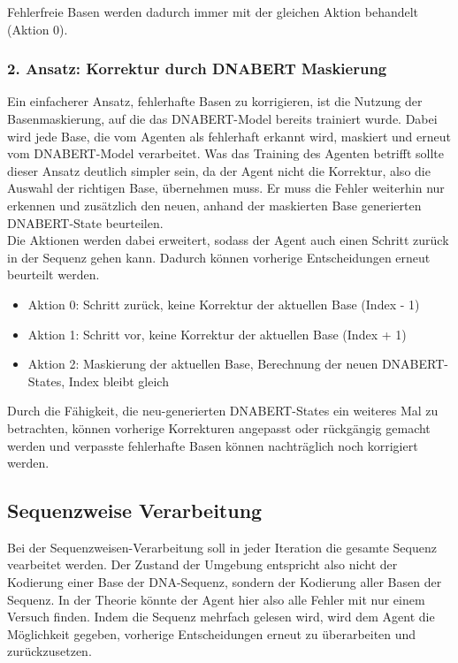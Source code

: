 \documentclass[oneside,bibliography=totocnumbered,BCOR=5mm]{scrbook}%
\theoremstyle{definition}
\theoremstyle{definition}
\theoremstyle{definition}
\theoremstyle{definition}
\theoremstyle{definition}
\theoremstyle{definition}
\begin{document}
Fehlerfreie Basen werden dadurch immer mit der gleichen Aktion behandelt (Aktion 0). 


\subsubsection{2. Ansatz: Korrektur durch DNABERT Maskierung}
Ein einfacherer Ansatz, fehlerhafte Basen zu korrigieren, ist die Nutzung der
Basenmaskierung, auf die das DNABERT-Model bereits trainiert wurde. 
Dabei wird jede Base, die vom Agenten als fehlerhaft erkannt wird, 
maskiert und erneut vom DNABERT-Model verarbeitet.
Was das Training des Agenten betrifft sollte dieser Ansatz deutlich simpler sein,
da der Agent nicht die Korrektur, also die Auswahl der richtigen Base, übernehmen muss.
Er muss die Fehler weiterhin nur erkennen und zusätzlich den neuen, 
anhand der maskierten Base generierten DNABERT-State beurteilen.\\

Die Aktionen werden dabei erweitert, sodass der Agent auch einen Schritt zurück in der Sequenz gehen kann.
Dadurch können vorherige Entscheidungen erneut beurteilt werden.\\

\begin{itemize}
  \item Aktion 0: Schritt zurück, keine Korrektur der aktuellen Base (Index - 1)
  \item Aktion 1: Schritt vor, keine Korrektur der aktuellen Base  (Index + 1)
  \item Aktion 2: Maskierung der aktuellen Base, Berechnung der neuen DNABERT-States, Index bleibt gleich
\end{itemize}

Durch die Fähigkeit, die neu-generierten DNABERT-States ein weiteres Mal zu betrachten,
können vorherige Korrekturen angepasst oder rückgängig gemacht werden und 
verpasste fehlerhafte Basen können nachträglich noch korrigiert werden.

\subsection{Sequenzweise Verarbeitung}
Bei der Sequenzweisen-Verarbeitung soll in jeder Iteration die gesamte Sequenz vearbeitet werden.
Der Zustand der Umgebung entspricht also nicht der Kodierung einer Base der DNA-Sequenz, sondern 
der Kodierung aller Basen der Sequenz. In der Theorie könnte der Agent hier also alle Fehler mit nur einem Versuch finden.
Indem die Sequenz mehrfach gelesen wird, wird dem Agent die Möglichkeit gegeben, vorherige Entscheidungen 
erneut zu überarbeiten und zurückzusetzen.\\
\end{document}
